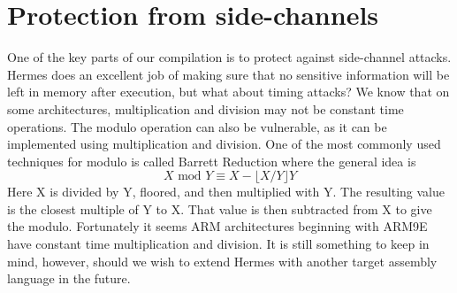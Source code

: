 








\clearpage
\newpage

\section{Protection from side-channels}
One of the key parts of our compilation is to protect against side-channel attacks.
Hermes does an excellent job of making sure that no sensitive information will be left in memory after execution, but what about timing attacks?
We know that on some architectures, multiplication and division may not be constant time operations.
The modulo operation can also be vulnerable, as it can be implemented using multiplication and division.
One of the most commonly used techniques for modulo is called Barrett Reduction where the general idea is
\begin{equation*}
  X \text{ mod } Y \equiv X - \lfloor{ X / Y }\rfloor Y
\end{equation*}
Here X is divided by Y, floored, and then multiplied with Y. The resulting value is the closest multiple of Y to X. That value is then subtracted from X to give the modulo. 
Fortunately it seems ARM architectures beginning with ARM9E have constant time multiplication and division\cite{bearssl}.
It is still something to keep in mind, however, should we wish to extend Hermes with another target assembly language in the future.

